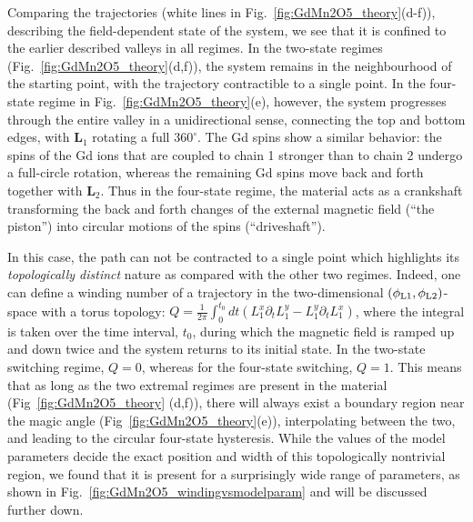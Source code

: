 Comparing the trajectories (white lines in Fig.~\ref{fig:GdMn2O5_theory}(d-f)), describing the field-dependent state of the system, we see that it is confined to the earlier described valleys in all regimes.
%
In the two-state regimes (Fig.~\ref{fig:GdMn2O5_theory}(d,f)), the system remains in the neighbourhood of the starting point, with the trajectory contractible to a single point. 
In the four-state regime in Fig.~\ref{fig:GdMn2O5_theory}(e), however, the system progresses through the entire valley in a unidirectional sense, connecting the top and bottom edges, with $\bm{L}_1$ rotating a full $360^\circ$.
The Gd spins show a similar behavior: the spins of the Gd ions that are coupled to chain 1 stronger than to chain 2 undergo a full-circle rotation, whereas the remaining Gd spins move back and forth together with $\bm{L}_2$.
Thus in the four-state regime, the material acts as a crankshaft transforming the back and forth changes of the external magnetic field (``the piston'') into circular motions of the spins (``driveshaft'').

In this case, the path can not be contracted to a single point which highlights its {\em  topologically distinct} nature as compared with the other two regimes.
Indeed, one can define a winding number of a trajectory in the two-dimensional  $(\phi_{\rm L1},\phi_{\rm L2})$-space with a torus topology: $Q=\frac{1}{2\pi}\int_0^{t_0} dt (L_1^x\partial_t L_1^y - L_1^y \partial_t L_1^x)$, 
where the integral is taken over the time interval, $t_0$, during which the magnetic field is ramped up and down twice and the system returns to its initial state.
In the two-state switching regime, $Q  = 0$, whereas for the four-state switching, $Q = 1$.
This means that as long as the two extremal regimes are present in the material (Fig~\ref{fig:GdMn2O5_theory} (d,f)), there will always exist a boundary region near the magic angle (Fig~\ref{fig:GdMn2O5_theory}(e)), interpolating between the two, and leading to the circular four-state hysteresis.
While the values of the model parameters decide the exact position and width of this topologically nontrivial region, we found that it is present for a surprisingly wide range of parameters, as shown in Fig.~\ref{fig:GdMn2O5_windingvsmodelparam} and will be discussed further down.

